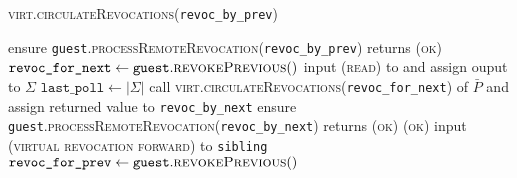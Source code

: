 \begin{center}
  \begin{processbox}{\textsc{virt.circulateRevocations}(\texttt{revoc\_by\_prev})}
    \begin{algorithmic}[1]
       
        \State ensure
        \texttt{guest}.\textsc{processRemoteRevocation}(\texttt{revoc\_by\_prev})
        returns (\textsc{ok})
        \label{code:virtual-layer:revocation:non-funder:proc-remote}
      \Else \: 
        \State $\texttt{revoc\_for\_next} \gets
        \texttt{guest}.\textsc{revokePrevious}()$
        \State input (\textsc{read}) to \ledger and assign ouput to $\Sigma$
        \State $\texttt{last\_poll} \gets |\Sigma|$
        \State call
        \textsc{virt.circulateRevocations}(\texttt{revoc\_for\_next}) of
        $\bar{P}$ and assign returned value to \texttt{revoc\_by\_next}
        \label{code:virtual-layer:revocation:revoc-by-next}
        \State ensure
        \texttt{guest}.\textsc{processRemoteRevocation}(\texttt{revoc\_by\_next})
        returns (\textsc{ok}) 
        \label{code:virtual-layer:revocation:funder:proc-remote}
        \State \Return (\textsc{ok})
      \EndIf
       
        \State input (\textsc{virtual revocation forward}) to \texttt{sibling}
        \State {}
        \State {}
        \State {}
        \State {}
        \State {}
        \State {}
        \State {}
      \EndIf
      \State $\texttt{revoc\_for\_prev} \gets
      \texttt{guest}.\textsc{revokePrevious}()$
       

\end{algorithmic}
\end{processbox}
\end{center}
